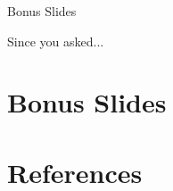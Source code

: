 \documentclass[pdf]{beamer}
\begin{document}
{
\addtocounter{framenumber}{-1}


\begin{frame}{Bonus Slides}

\begin{center}\Large Since you asked...\end{center}

\end{frame}
}

\section{Bonus Slides}







{
\addtocounter{framenumber}{-1}
\section*{References}
\begin{frame}

\end{frame}
}
\end{document}

